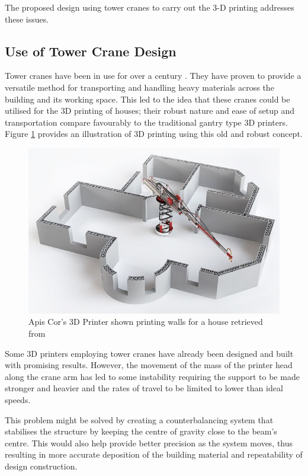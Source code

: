 \documentclass{UoNMCHA}
\numberwithin{equation}{section}
\begin{document}
The proposed design using tower cranes to carry out the 3-D printing addresses these issues.
	
	\subsection{Use of Tower Crane Design}
	
	
	Tower cranes have been in use for over a century \cite{wolff}. They have proven to provide a versatile method for transporting and handling heavy materials across the building and its working space. This led to the idea that these cranes could be utilised for the 3D printing of houses; their robust nature and ease of setup and transportation compare favourably to the traditional gantry type 3D printers. Figure \ref{figs/Picture37} provides an illustration of 3D printing using this old and robust concept.\\
	
	\begin{figure}[H]
		\begin{center}
			\includegraphics[width=.75\linewidth]{figs/Picture37}
			\caption{Apis Cor's 3D Printer shown printing walls for a house retrieved from \cite{beach_new}}
			\label{figs/Picture37}
		\end{center}
	\end{figure}
	
	Some 3D printers employing tower cranes have already been designed and built with promising results. However, the movement of the mass of the printer head along the crane arm has led to some instability requiring the support to be made stronger and heavier and the rates of travel to be limited to lower than ideal speeds. \par
	
	This problem might be solved by creating a counterbalancing system that stabilises the
	structure by keeping the centre of gravity close to the beam’s centre. This would also help provide better precision as the system moves, thus resulting in more accurate deposition of the building material and repeatability of design construction.
	
\end{document}
